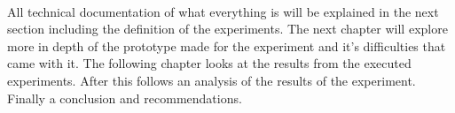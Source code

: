 ~\\ All technical documentation of what everything is will be explained in the next section including the definition of the experiments.
The next chapter will explore more in depth of the prototype made for the experiment and it's difficulties that came with it. The following chapter looks at the results from the  executed experiments. After this follows an analysis of the results of the experiment. Finally a conclusion and recommendations.